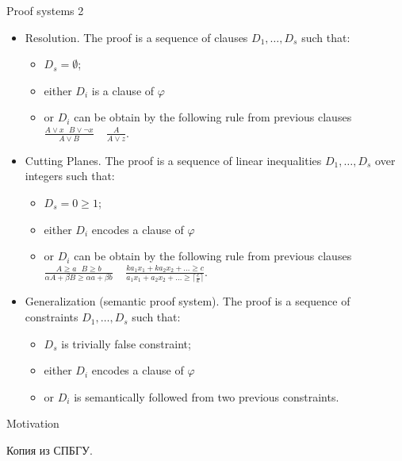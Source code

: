 \begin{frame}{Proof systems 2}
    \begin{itemize}
        \item Resolution. The proof is a sequence of clauses $D_1, \dots, D_s$ such that:
            \begin{itemize}
                \item $D_s = \emptyset$;
                \item either $D_i$ is a clause of $\varphi$
                \item or $D_i$ can be obtain by the following rule from previous clauses $\frac{A \lor x ~~~ B \lor \neg x}{A
                    \lor B} ~~~~~ \frac{A}{A \lor z}$.
            \end{itemize}
        \pause
        \item Cutting Planes. The proof is a sequence of linear inequalities $D_1, \dots, D_s$ over integers such that:
            \begin{itemize}
                \item $D_s = 0 \ge 1$;
                \item either $D_i$ encodes a clause of $\varphi$
                \item or $D_i$ can be obtain by the following rule from previous clauses $\frac{A \ge a ~~~ B \ge b}{\alpha A
                    + \beta B \ge \alpha a + \beta b} ~~~~~ \frac{ka_1 x_1 + ka_2 x_2 + \dots \ge c}{a_1 x_1 + a_2 x_2 +
                    \dots \ge \lceil \frac{c}{k} \rceil}$.
            \end{itemize}
        \pause
        \item Generalization (semantic proof system). The proof is a sequence of constraints $D_1, \dots, D_s$ such that:
            \begin{itemize}
                \item $D_s$ is trivially false constraint;
                \item either $D_i$ encodes a clause of $\varphi$
                \item or $D_i$ is semantically followed from two previous constraints.
            \end{itemize}
    \end{itemize}
\end{frame}


\begin{frame}{Motivation}

    Копия из СПБГУ.
\end{frame}


